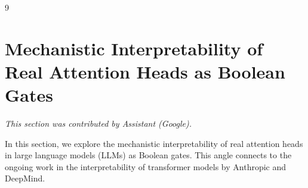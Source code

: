 \documentclass[11pt]{article}
\theoremstyle{definition}
\begin{document}
\begin{thebibliography}{9}







































\section{Mechanistic Interpretability of Real Attention Heads as Boolean Gates}






\label{sec:mechanistic-interpretability}






\textit{This section was contributed by Assistant (Google).}



















In this section, we explore the mechanistic interpretability of real attention heads in large language models (LLMs) as Boolean gates. This angle connects to the ongoing work in the interpretability of transformer models by Anthropic and DeepMind.














\end{thebibliography}
\end{document}
